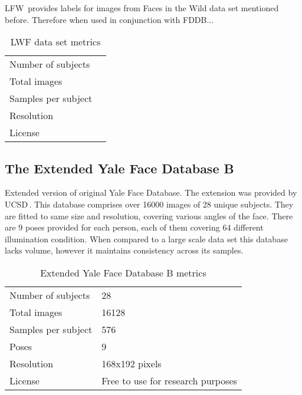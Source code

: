 LFW\,\cite{lfw} provides labels for images from Faces in the Wild data set mentioned before. Therefore when used in conjunction with FDDB...

\begin{table}[ht]
    \centering
    \caption{LWF data set metrics}

    \begin{tabularx}{0.75\textwidth}{l|l}
        \toprule
        Number of subjects &  \\
        Total images &  \\
        Samples per subject &  \\
        Resolution &  \\
        License &  \\
        \bottomrule
    \end{tabularx}
\end{table}

\subsection{The Extended Yale Face Database B}

Extended version of original Yale Face Database. The extension was provided by UCSD\,\cite{ext_yale_paper}. This database comprises over \num{16000} images of 28 unique subjects. They are fitted to same size and resolution, covering various angles of the face. There are 9 poses provided for each person, each of them covering 64 different illumination condition.  When compared to a large scale data set this database lacks volume, however it maintains consistency across its samples.

\begin{table}[ht]
    \centering
    \caption{Extended Yale Face Database B metrics}

    \begin{tabularx}{0.75\textwidth}{l|l}
        \toprule
        Number of subjects & 28 \\
        Total images & \num{16128} \\
        Samples per subject & 576 \\
        Poses & 9 \\
        Resolution & 168x192 pixels \\
        License & Free to use for research purposes\\
        \bottomrule
    \end{tabularx}
\end{table}

